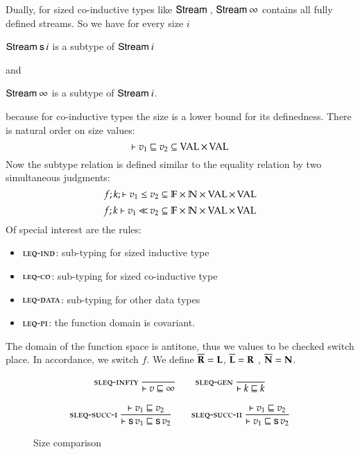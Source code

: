 Dually, for sized co-inductive types like $\mathsf{Stream}\:$,
$\mathsf{Stream}\: \infty$ contains all fully defined streams.
So we have for every size $i$
\begin{bsp}
$\mathsf{Stream}\: \mathsf{s}\, i $ is a subtype of $\mathsf{Stream}\: i$
\end{bsp}
and
\begin{bsp}
$\mathsf{Stream}\: \infty$ is a subtype of $\mathsf{Stream}\: i$.
\end{bsp}
because for co-inductive types the size is a lower bound for its definedness.
There is natural order on size values: 
\[\vdash v_1\sqsubseteq v_2 \subseteq \operatorname{VAL} \times \operatorname{VAL} \]
Now the subtype relation is defined similar to the equality relation by two simultaneous judgments:
\[f;k;\vdash v_1\leq v_2 \subseteq \mathbb{F} \times \mathbb{N} \times \operatorname{VAL} \times \operatorname{VAL} \]
\[f;k\vdash v_1{\:\ll\:}v_2 \subseteq \mathbb{F} \times \mathbb{N} \times\operatorname{VAL} \times \operatorname{VAL} \]
Of special interest are the rules:
\begin{itemize}
\item
$\mbox{\sc leq-ind}$: sub-typing for sized inductive type 
\item
$\mbox{\sc leq-co}$: sub-typing for sized co-inductive type
\item
$\mbox{\sc leq-data}$: sub-typing for other data types
\item
$\mbox{\sc leq-pi}$: the function domain is covariant.
\end{itemize}
The domain of the function space is antitone, thus we values to be checked switch place.
In accordance, we switch $f$.
We define $\overline{\mathbf{R}}=\mathbf{L}$,  $\overline{\mathbf{L}}=\mathbf{R}$ ,  $\overline{\mathbf{N}}=\mathbf{N}$.


\begin{figure}
\begin{gather*}
\mbox{\sc sleq-infty}\ \dfrac{}{\vdash v\sqsubseteq\infty}
\qquad
\mbox{\sc sleq-gen}\ \dfrac{}{\vdash k\sqsubseteq k}
\\[2ex]
\mbox{\sc sleq-succ-i}\ \dfrac{\vdash v_1\sqsubseteq v_2}{\vdash\mathsf{s}\, v_1\sqsubseteq\mathsf{s}\, v_2}
\qquad
\mbox{\sc sleq-succ-ii}\ \dfrac{\vdash v_1\sqsubseteq v_2}{\vdash v_1\sqsubseteq\mathsf{s}\, v_2}
\end{gather*}
\caption{Size comparison}
\end{figure}

